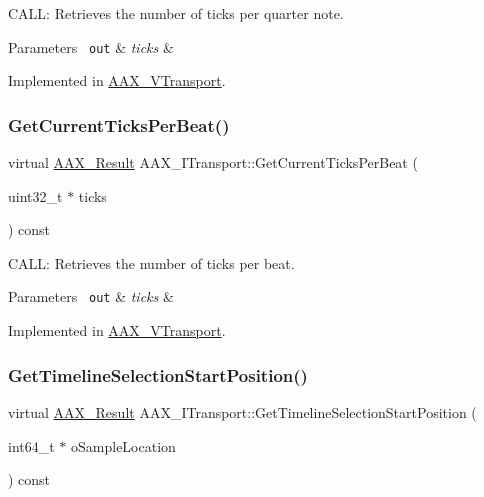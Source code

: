 C\+A\+LL\+: Retrieves the number of ticks per quarter note. 


\begin{DoxyParams}[1]{Parameters}
\mbox{\texttt{ out}}  & {\em ticks} & \\
\hline
\end{DoxyParams}


Implemented in \mbox{\hyperlink{a01941_abe58c0dec6b49b78d9634da7cb2fa8d7}{A\+A\+X\+\_\+\+V\+Transport}}.

\mbox{\label{a01885_aa5cfd6fef3e4950583ec1e050be692ec}} 
\subsubsection{\texorpdfstring{GetCurrentTicksPerBeat()}{GetCurrentTicksPerBeat()}}
{\footnotesize\ttfamily virtual \mbox{\hyperlink{a00392_a4d8f69a697df7f70c3a8e9b8ee130d2f}{A\+A\+X\+\_\+\+Result}} A\+A\+X\+\_\+\+I\+Transport\+::\+Get\+Current\+Ticks\+Per\+Beat (\begin{DoxyParamCaption}\item[{uint32\+\_\+t $\ast$}]{ticks }\end{DoxyParamCaption}) const\hspace{0.3cm}{\ttfamily [pure virtual]}}



C\+A\+LL\+: Retrieves the number of ticks per beat. 


\begin{DoxyParams}[1]{Parameters}
\mbox{\texttt{ out}}  & {\em ticks} & \\
\hline
\end{DoxyParams}


Implemented in \mbox{\hyperlink{a01941_a8df039482006decb5fa07cd464cdf402}{A\+A\+X\+\_\+\+V\+Transport}}.

\mbox{\label{a01885_a639677fc4237183baac85d00f1a5f6d5}} 
\subsubsection{\texorpdfstring{GetTimelineSelectionStartPosition()}{GetTimelineSelectionStartPosition()}}
{\footnotesize\ttfamily virtual \mbox{\hyperlink{a00392_a4d8f69a697df7f70c3a8e9b8ee130d2f}{A\+A\+X\+\_\+\+Result}} A\+A\+X\+\_\+\+I\+Transport\+::\+Get\+Timeline\+Selection\+Start\+Position (\begin{DoxyParamCaption}\item[{int64\+\_\+t $\ast$}]{o\+Sample\+Location }\end{DoxyParamCaption}) const\hspace{0.3cm}{\ttfamily [pure virtual]}}



